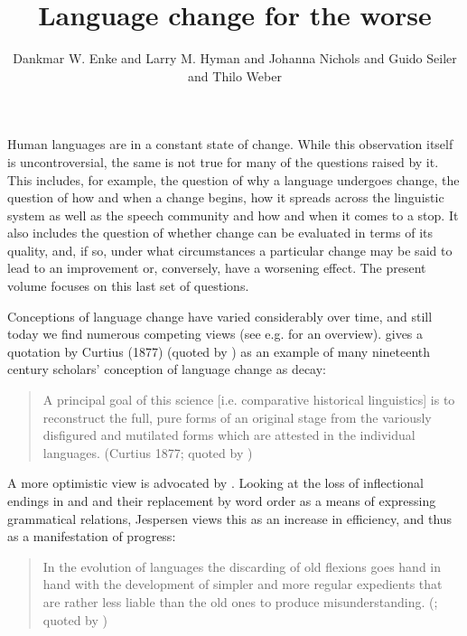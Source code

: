 \documentclass[output=paper,hidelinks]{langscibook}
\author{Dankmar W. Enke\affiliation{LMU Munich} and Larry M. Hyman\affiliation{University of California, Berkeley} and Johanna Nichols\affiliation{University of California, Berkeley; University of Helsinki; \\ Higher School of Economics, Moscow} and Guido Seiler\affiliation{University of Zurich} and  Thilo Weber\affiliation{Leibniz Institute for the German Language (IDS), Mannheim}}
\title{Language change for the worse}
\begin{document}
\maketitle

\noindent Human languages are in a constant state of change. While this observation itself is uncontroversial, the same is not true for many of the questions raised by it. This includes, for example, the question of why a language undergoes change, the question of how and when a change begins, how it spreads across the linguistic system as well as the speech community and how and when it comes to a stop. It also includes the question of whether change can be evaluated in terms of its quality, and, if so, under what circumstances a particular change may be said to lead to an improvement or, conversely, have a worsening effect. The present volume focuses on this last set of questions.

\begin{sloppypar}
Conceptions of language change have varied considerably over time, and still today we find numerous competing views (see e.g. \citealt{Aitchison_2001} for an overview). \citet[251]{Aitchison_2001} gives a quotation by Curtius (1877) (quoted by \citealt[35]{Kiparsky_1972}) as an example of many nineteenth century scholars' conception of language change as decay:
\end{sloppypar}

\begin{quote}
A principal goal of this science [i.e. comparative historical linguistics] is to reconstruct the full, pure forms of an original stage from the variously disfigured and mutilated forms which are attested in the individual languages. (Curtius 1877; quoted by \citealt[251]{Aitchison_2001})
\end{quote}

A more optimistic view is advocated by \citet{Jespersen_1922}. Looking at the loss of inflectional endings in  and  and their replacement by word order as a means of expressing grammatical relations, Jespersen views this as an increase in efficiency, and thus as a manifestation of progress: 

\begin{quote}
In the evolution of languages the discarding of old flexions goes hand in hand with the development of simpler and more regular expedients that are rather less liable than the old ones to produce misunderstanding.  (\citealt{Jespersen_1922}; quoted by \citealt[7]{Aitchison_2001})
\end{quote}
\end{document}
